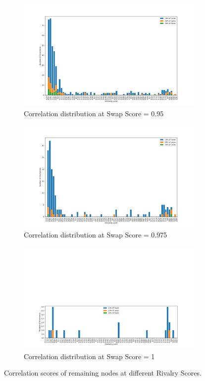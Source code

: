 \begin{figure}[!htb]
	\centering
	\begin{subfigure}[b]{0.30\linewidth}
		\includegraphics[width=\linewidth]{Minor Thesis/figures/graphs/hist/Hist95.png}
		\caption{Correlation distribution at Swap Score = 0.95}
	\end{subfigure}
	\hfill
	\begin{subfigure}[b]{0.30\linewidth}
		\includegraphics[width=\linewidth]{Minor Thesis/figures/graphs/hist/Hist975.png}
		\caption{Correlation distribution at Swap Score = 0.975}
	\end{subfigure}
	\hfill
	\begin{subfigure}[b]{0.30\linewidth}
		\includegraphics[width=\linewidth]{Minor Thesis/figures/graphs/hist/Hist1.png}
		\caption{Correlation distribution at Swap Score = 1}
	\end{subfigure}	
	\caption{Correlation scores of remaining nodes at different Rivalry Scores.}
	\label{fig:triade-hist}
\end{figure}

